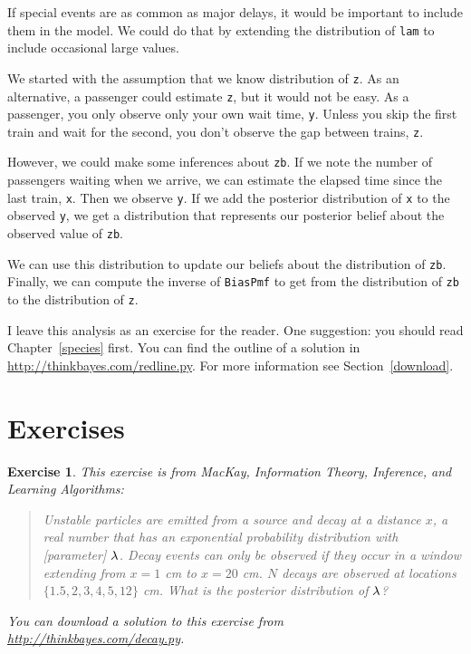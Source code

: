\documentclass[12pt]{book}
\theoremstyle{exercise}
\newtheorem{exercise}{Exercise}[chapter]
\newcommand{\py}[1]{{\tt #1}}%
\begin{document}
If special events are as common as major delays, it would
be important to include them in the model.  We could do that by
extending the distribution of \py{lam} to include occasional
large values.

We started with the assumption that we know
distribution of \py{z}.
As an alternative, a passenger could estimate \py{z}, but it would
not be easy.
As a passenger, you only
observe only your own wait time, \py{y}.  Unless you skip
the first train and wait for the second, you don't
observe the gap between trains, \py{z}.

However, we could make some inferences about \py{zb}.  If we note
the number of passengers waiting when we arrive, we can estimate
the elapsed time since the last train, \py{x}.  Then we observe
\py{y}.  If we add the posterior distribution of \py{x} to
the observed \py{y}, we get a distribution that represents
our posterior belief about the observed value of \py{zb}.

We can use this distribution to update our beliefs about the
distribution of \py{zb}.  Finally, we can compute the
inverse of \py{BiasPmf} to get from the distribution of \py{zb}
to the distribution of \py{z}.

I leave this analysis as an exercise for the
reader.  One suggestion: you should read Chapter~\ref{species} first.
You can find the outline of
a solution in \url{http://thinkbayes.com/redline.py}.
  For more information
see Section~\ref{download}.

\section{Exercises}

\begin{exercise}
This exercise is from
MacKay, {\em Information Theory, Inference, and Learning Algorithms}:

\begin{quote}
    Unstable particles are emitted from a source and decay at a
distance $x$, a real number that has an exponential probability
distribution with [parameter] $\mathtt{\lambda}$.  Decay events can only be
observed if they occur in a window extending from $x=1$ cm to $x=20$
cm.  $N$ decays are observed at locations $\{ 1.5, 2, 3, 4, 5, 12 \}$
cm.  What is the posterior distribution of $\mathtt{\lambda}$?

\end{quote}

You can download a solution to this exercise from
\url{http://thinkbayes.com/decay.py}.

\end{exercise}
\end{document}
